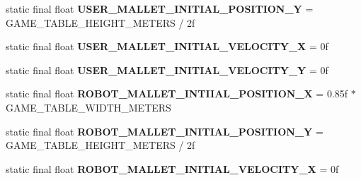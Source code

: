\begin{DoxyCompactItemize}
\item 
\hypertarget{classairhockeyjava_1_1game_1_1_constants_ad62960f79aa1cd275a270fad68358f9e}{}static final float {\bfseries U\+S\+E\+R\+\_\+\+M\+A\+L\+L\+E\+T\+\_\+\+I\+N\+I\+T\+I\+A\+L\+\_\+\+P\+O\+S\+I\+T\+I\+O\+N\+\_\+\+Y} = G\+A\+M\+E\+\_\+\+T\+A\+B\+L\+E\+\_\+\+H\+E\+I\+G\+H\+T\+\_\+\+M\+E\+T\+E\+R\+S / 2f\label{classairhockeyjava_1_1game_1_1_constants_ad62960f79aa1cd275a270fad68358f9e}

\item 
\hypertarget{classairhockeyjava_1_1game_1_1_constants_a4a1cc6c704052f7e9ba144a7db4be862}{}static final float {\bfseries U\+S\+E\+R\+\_\+\+M\+A\+L\+L\+E\+T\+\_\+\+I\+N\+I\+T\+I\+A\+L\+\_\+\+V\+E\+L\+O\+C\+I\+T\+Y\+\_\+\+X} = 0f\label{classairhockeyjava_1_1game_1_1_constants_a4a1cc6c704052f7e9ba144a7db4be862}

\item 
\hypertarget{classairhockeyjava_1_1game_1_1_constants_a72a0d25fa20ce7d1e5c4ffee1e2fc8a7}{}static final float {\bfseries U\+S\+E\+R\+\_\+\+M\+A\+L\+L\+E\+T\+\_\+\+I\+N\+I\+T\+I\+A\+L\+\_\+\+V\+E\+L\+O\+C\+I\+T\+Y\+\_\+\+Y} = 0f\label{classairhockeyjava_1_1game_1_1_constants_a72a0d25fa20ce7d1e5c4ffee1e2fc8a7}

\item 
\hypertarget{classairhockeyjava_1_1game_1_1_constants_a06dbdef7f84dab7b2c81e9305bc7ec49}{}static final float {\bfseries R\+O\+B\+O\+T\+\_\+\+M\+A\+L\+L\+E\+T\+\_\+\+I\+N\+T\+I\+I\+A\+L\+\_\+\+P\+O\+S\+I\+T\+I\+O\+N\+\_\+\+X} = 0.\+85f $\ast$ G\+A\+M\+E\+\_\+\+T\+A\+B\+L\+E\+\_\+\+W\+I\+D\+T\+H\+\_\+\+M\+E\+T\+E\+R\+S\label{classairhockeyjava_1_1game_1_1_constants_a06dbdef7f84dab7b2c81e9305bc7ec49}

\item 
\hypertarget{classairhockeyjava_1_1game_1_1_constants_a64dc47f3c70b1be64259f54cc5b426a0}{}static final float {\bfseries R\+O\+B\+O\+T\+\_\+\+M\+A\+L\+L\+E\+T\+\_\+\+I\+N\+I\+T\+I\+A\+L\+\_\+\+P\+O\+S\+I\+T\+I\+O\+N\+\_\+\+Y} = G\+A\+M\+E\+\_\+\+T\+A\+B\+L\+E\+\_\+\+H\+E\+I\+G\+H\+T\+\_\+\+M\+E\+T\+E\+R\+S / 2f\label{classairhockeyjava_1_1game_1_1_constants_a64dc47f3c70b1be64259f54cc5b426a0}

\item 
\hypertarget{classairhockeyjava_1_1game_1_1_constants_a80bbc1193ac59c42f3cc628291e18c24}{}static final float {\bfseries R\+O\+B\+O\+T\+\_\+\+M\+A\+L\+L\+E\+T\+\_\+\+I\+N\+I\+T\+I\+A\+L\+\_\+\+V\+E\+L\+O\+C\+I\+T\+Y\+\_\+\+X} = 0f\label{classairhockeyjava_1_1game_1_1_constants_a80bbc1193ac59c42f3cc628291e18c24}


\end{DoxyCompactItemize}
